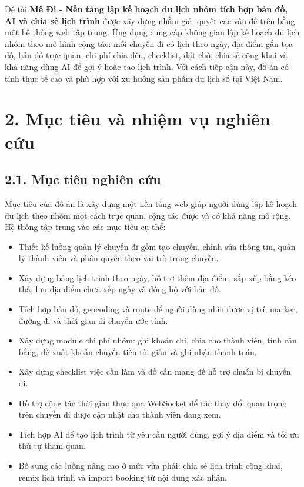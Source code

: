 \documentclass[a4paper]{report}
\newcommand{\ProjectName}{Mê Đi}
\newcommand{\ProjectTitle}{\ProjectName{} - Nền tảng lập kế hoạch du lịch nhóm tích hợp bản đồ, AI và chia sẻ lịch trình}
\begin{document}
Đề tài \textbf{\ProjectTitle} được xây dựng nhằm giải quyết các vấn đề trên bằng một hệ thống web tập trung. Ứng dụng cung cấp không gian lập kế hoạch du lịch nhóm theo mô hình cộng tác: mỗi chuyến đi có lịch theo ngày, địa điểm gắn tọa độ, bản đồ trực quan, chi phí chia đều, checklist, đặt chỗ, chia sẻ công khai và khả năng dùng AI để gợi ý hoặc tạo lịch trình. Với cách tiếp cận này, đồ án có tính thực tế cao và phù hợp với xu hướng sản phẩm du lịch số tại Việt Nam.

\section*{2. Mục tiêu và nhiệm vụ nghiên cứu}

\subsection*{2.1. Mục tiêu nghiên cứu}

Mục tiêu của đồ án là xây dựng một nền tảng web giúp người dùng lập kế hoạch du lịch theo nhóm một cách trực quan, cộng tác được và có khả năng mở rộng. Hệ thống tập trung vào các mục tiêu cụ thể:

\begin{itemize}
  \item Thiết kế luồng quản lý chuyến đi gồm tạo chuyến, chỉnh sửa thông tin, quản lý thành viên và phân quyền theo vai trò trong chuyến.
  \item Xây dựng bảng lịch trình theo ngày, hỗ trợ thêm địa điểm, sắp xếp bằng kéo thả, lưu địa điểm chưa xếp ngày và đồng bộ với bản đồ.
  \item Tích hợp bản đồ, geocoding và route để người dùng nhìn được vị trí, marker, đường đi và thời gian di chuyển ước tính.
  \item Xây dựng module chi phí nhóm: ghi khoản chi, chia cho thành viên, tính cân bằng, đề xuất khoản chuyển tiền tối giản và ghi nhận thanh toán.
  \item Xây dựng checklist việc cần làm và đồ cần mang để hỗ trợ chuẩn bị chuyến đi.
  \item Hỗ trợ cộng tác thời gian thực qua WebSocket để các thay đổi quan trọng trên chuyến đi được cập nhật cho thành viên đang xem.
  \item Tích hợp AI để tạo lịch trình từ yêu cầu người dùng, gợi ý địa điểm và tối ưu thứ tự tham quan.
  \item Bổ sung các luồng nâng cao ở mức vừa phải: chia sẻ lịch trình công khai, remix lịch trình và import booking từ nội dung xác nhận.
\end{itemize}
\end{document}

